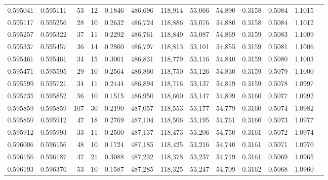 \begin{tabular}{rrrrrrrrrrrrr}
0.595041 & 0.595111 &    53 &  12 &                                     0.1846 & 486,696 & 118,914 &  53,066 &  54,890 & 0.3158 & 0.5084 & 1.1015 \\
0.595117 & 0.595256 &    28 &  10 &                                     0.2632 & 486,724 & 118,886 &  53,076 &  54,880 & 0.3158 & 0.5084 & 1.1012 \\
0.595257 & 0.595322 &    37 &  11 &                                     0.2292 & 486,761 & 118,849 &  53,087 &  54,869 & 0.3159 & 0.5083 & 1.1009 \\
0.595337 & 0.595457 &    36 &  14 &                                     0.2800 & 486,797 & 118,813 &  53,101 &  54,855 & 0.3159 & 0.5081 & 1.1006 \\
0.595461 & 0.595461 &    34 &  15 &                                     0.3061 & 486,831 & 118,779 &  53,116 &  54,840 & 0.3159 & 0.5080 & 1.1003 \\
0.595471 & 0.595595 &    29 &  10 &                                     0.2564 & 486,860 & 118,750 &  53,126 &  54,830 & 0.3159 & 0.5079 & 1.1000 \\
0.595599 & 0.595721 &    34 &  11 &                                     0.2444 & 486,894 & 118,716 &  53,137 &  54,819 & 0.3159 & 0.5078 & 1.0997 \\
0.595735 & 0.595852 &    56 &  10 &                                     0.1515 & 486,950 & 118,660 &  53,147 &  54,809 & 0.3160 & 0.5077 & 1.0992 \\
0.595859 & 0.595859 &   107 &  30 &                                     0.2190 & 487,057 & 118,553 &  53,177 &  54,779 & 0.3160 & 0.5074 & 1.0982 \\
0.595859 & 0.595912 &    47 &  18 &                                     0.2769 & 487,104 & 118,506 &  53,195 &  54,761 & 0.3160 & 0.5073 & 1.0977 \\
0.595912 & 0.595993 &    33 &  11 &                                     0.2500 & 487,137 & 118,473 &  53,206 &  54,750 & 0.3161 & 0.5072 & 1.0974 \\
0.596006 & 0.596156 &    48 &  10 &                                     0.1724 & 487,185 & 118,425 &  53,216 &  54,740 & 0.3161 & 0.5071 & 1.0970 \\
0.596156 & 0.596187 &    47 &  21 &                                     0.3088 & 487,232 & 118,378 &  53,237 &  54,719 & 0.3161 & 0.5069 & 1.0965 \\
0.596193 & 0.596376 &    53 &  10 &                                     0.1587 & 487,285 & 118,325 &  53,247 &  54,709 & 0.3162 & 0.5068 & 1.0960 \\

\end{tabular}
